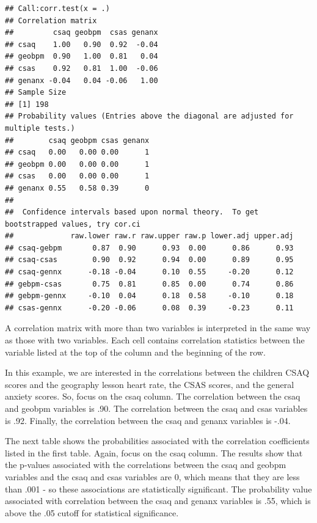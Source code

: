 \documentclass[
]{book}
\begin{document}
\begin{verbatim}
## Call:corr.test(x = .)
## Correlation matrix 
##         csaq geobpm  csas genanx
## csaq    1.00   0.90  0.92  -0.04
## geobpm  0.90   1.00  0.81   0.04
## csas    0.92   0.81  1.00  -0.06
## genanx -0.04   0.04 -0.06   1.00
## Sample Size 
## [1] 198
## Probability values (Entries above the diagonal are adjusted for multiple tests.) 
##        csaq geobpm csas genanx
## csaq   0.00   0.00 0.00      1
## geobpm 0.00   0.00 0.00      1
## csas   0.00   0.00 0.00      1
## genanx 0.55   0.58 0.39      0
## 
##  Confidence intervals based upon normal theory.  To get bootstrapped values, try cor.ci
##             raw.lower raw.r raw.upper raw.p lower.adj upper.adj
## csaq-gebpm       0.87  0.90      0.93  0.00      0.86      0.93
## csaq-csas        0.90  0.92      0.94  0.00      0.89      0.95
## csaq-gennx      -0.18 -0.04      0.10  0.55     -0.20      0.12
## gebpm-csas       0.75  0.81      0.85  0.00      0.74      0.86
## gebpm-gennx     -0.10  0.04      0.18  0.58     -0.10      0.18
## csas-gennx      -0.20 -0.06      0.08  0.39     -0.23      0.11
\end{verbatim}

A correlation matrix with more than two variables is interpreted in the same way as those with two variables. Each cell contains correlation statistics between the variable listed at the top of the column and the beginning of the row.

In this example, we are interested in the correlations between the children CSAQ scores and the geography lesson heart rate, the CSAS scores, and the general anxiety scores. So, focus on the csaq column. The correlation between the csaq and geobpm variables is .90. The correlation between the csaq and csas variables is .92. Finally, the correlation between the csaq and genanx variables is -.04.

The next table shows the probabilities associated with the correlation coefficients listed in the first table. Again, focus on the csaq column. The results show that the p-values associated with the correlations between the csaq and geobpm variables and the csaq and csas variables are 0, which means that they are less than .001 - so these associations are statistically significant. The probability value associated with correlation between the csaq and genanx variables is .55, which is above the .05 cutoff for statistical significance.
\end{document}
